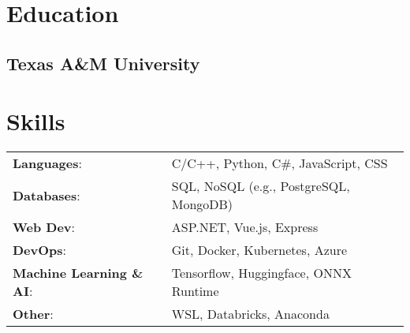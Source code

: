 \documentclass[]{resume-openfont}
\begin{document}
\begin{minipage}[t]{1\textwidth} 
\end{minipage}

\vspace{2 mm}

\begin{minipage}[t]{0.4\textwidth} 
    \section{\Large Education} 
    \subsection{Texas A\&M University}
\end{minipage}%
\hfill
\begin{minipage}[t]{0.6\textwidth}
    \section{\Large Skills}
        \vspace{-1.5 mm}
        \begin{tabular}{@{}l l}
            \textbf{Languages}: & C/C++, Python, C\#, JavaScript, CSS \\
            \textbf{Databases}: & SQL, NoSQL (e.g., PostgreSQL, MongoDB) \\
            \textbf{Web Dev}: & ASP.NET, Vue.js, Express \\
            \textbf{DevOps}: & Git, Docker, Kubernetes, Azure \\
            \textbf{Machine Learning \& AI}: & Tensorflow, Huggingface, ONNX Runtime \\
            \textbf{Other}: & WSL, Databricks, Anaconda \\
        \end{tabular}
\end{minipage}
\end{document}
